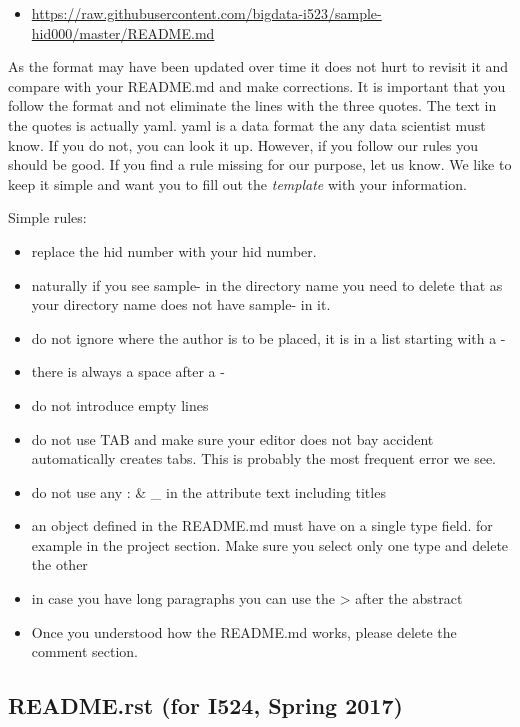\begin{itemize}

\item
  \url{https://raw.githubusercontent.com/bigdata-i523/sample-hid000/master/README.md}
\end{itemize}

As the format may have been updated over time it does not hurt to
revisit it and compare with your README.md and make corrections. It is
important that you follow the format and not eliminate the lines with
the three quotes. The text in the quotes is actually yaml. yaml is a
data format the any data scientist must know. If you do not, you can
look it up. However, if you follow our rules you should be good. If you
find a rule missing for our purpose, let us know. We like to keep it
simple and want you to fill out the \emph{template} with your
information.

Simple rules:

\begin{itemize}

\item
  replace the hid number with your hid number.
\item
  naturally if you see sample- in the directory name you need to delete
  that as your directory name does not have sample- in it.
\item
  do not ignore where the author is to be placed, it is in a list
  starting with a -
\item
  there is always a space after a -
\item
  do not introduce empty lines
\item
  do not use TAB and make sure your editor does not bay accident
  automatically creates tabs. This is probably the most frequent error
  we see.
\item
  do not use any : \& \_ in the attribute text including titles
\item
  an object defined in the README.md must have on a single type field.
  for example in the project section. Make sure you select only one type
  and delete the other
\item
  in case you have long paragraphs you can use the \textgreater{} after
  the abstract
\item
  Once you understood how the README.md works, please delete the comment
  section.
\end{itemize}

\subsection{README.rst (for I524, Spring
2017)}\label{readme.rst-for-i524-spring-2017}

